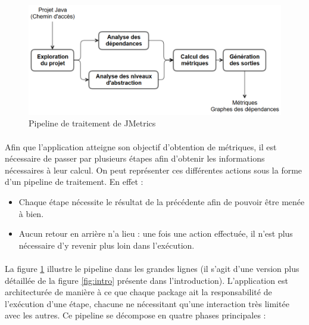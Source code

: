 \documentclass{scrartcl}
\begin{document}
\begin{figure}[ht]
    \centering
    \includegraphics[width=\textwidth]{img/SimplifiedPipeline.png}    
    \caption{Pipeline de traitement de JMetrics}
    \label{fig:simplepipe}
\end{figure}

    \paragraph{}Afin que l'application atteigne son objectif d'obtention de métriques, il est nécessaire de passer par plusieurs étapes afin d'obtenir les informations nécessaires à leur calcul. On peut représenter ces différentes actions sous la forme d'un pipeline de traitement. En effet :

\begin{itemize}
	\item Chaque étape nécessite le résultat de la précédente afin de pouvoir être menée à bien.
	\item Aucun retour en arrière n'a lieu : une fois une action effectuée, il n'est plus nécessaire d'y revenir plus loin dans l'exécution.
\end{itemize}

    \paragraph{}La figure \ref{fig:simplepipe} illustre le pipeline dans les grandes lignes (il s'agit d'une version plus détaillée de la figure \ref{fig:intro} présente dans l'introduction). L'application est architecturée de manière à ce que chaque package ait la responsabilité de l'exécution d'une étape, chacune ne nécessitant qu'une interaction très limitée avec les autres. Ce pipeline se décompose en quatre phases principales :
\end{document}
